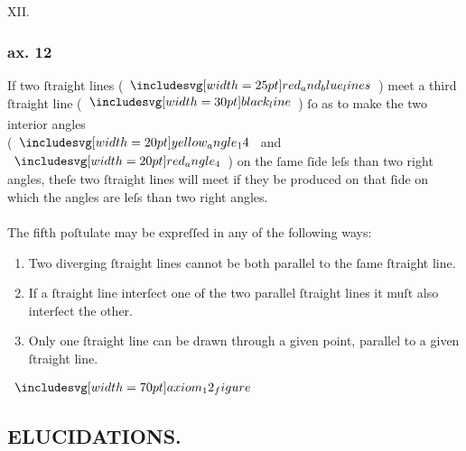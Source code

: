 \begin{center}
    XII.\label{ax12}\\
    \hfill
\end{center}
\begin{minipage}{0.67\textwidth}
    \subsubsection{ax. 12}
    \begin{center}
        \raggedright If two ſtraight lines (\hspace{-1ex}$\img{red_and_blue_lines}$\hspace{-1ex}) meet a third ſtraight line (\hspace{-1ex}$\blackline$\hspace{-1ex}) ſo as to make the two interior angles\\ (\hspace{-1ex}$\img[0][0][20]{yellow_angle_14}$ and $\img[0][0][20]{red_angle_4}$\hspace{-1ex}) on the ſame ſide leſs than two right angles, theſe two ſtraight lines will meet if they be produced on that ſide on which the angles are leſs than two right angles.\\
        \hfill\\
        The fifth poſtulate may be expreſſed in any of the following ways:\\
        \begin{enumerate}
            \item Two diverging ſtraight lines cannot be both parallel to the ſame ſtraight line.
            \item If a ſtraight line interſect one of the two parallel ſtraight lines it muſt also interſect the other.
            \item Only one ſtraight line can be drawn through a given point, parallel to a given ſtraight line.
        \end{enumerate}
    \end{center}
\end{minipage}%
\begin{minipage}{0.33\textwidth}
    \begin{center}
        $\img[0][0][70]{axiom_12_figure}$
    \end{center}
\end{minipage}

\pagebreak

\begin{center}
    \subsection[Elucidations]{\centering \scshape{\LARGE{ELUCIDATIONS.}}}
    \label{subsec:elucidations}
\end{center}


